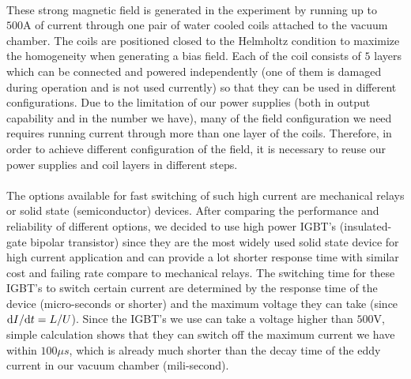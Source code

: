 \\
These strong magnetic field is generated in the experiment by running up to $500\text{A}$ of current through one pair of water cooled coils attached to the vacuum chamber. The coils are positioned closed to the Helmholtz condition to maximize the homogeneity when generating a bias field. Each of the coil consists of $5$ layers which can be connected and powered independently (one of them is damaged during operation and is not used currently) so that they can be used in different configurations. Due to the limitation of our power supplies (both in output capability and in the number we have), many of the field configuration we need requires running current through more than one layer of the coils. Therefore, in order to achieve different configuration of the field, it is necessary to reuse our power supplies and coil layers in different steps.\\
\\
The options available for fast switching of such high current are mechanical relays or solid state (semiconductor) devices. After comparing the performance and reliability of different options, we decided to use high power IGBT's (insulated-gate bipolar transistor) since they are the most widely used solid state device for high current application and can provide a lot shorter response time with similar cost and failing rate compare to mechanical relays. The switching time for these IGBT's to switch certain current are determined by the response time of the device (micro-seconds or shorter) and the maximum voltage they can take (since $\mathrm{d} I/\mathrm{d} t=L/U$). Since the IGBT's we use can take a voltage higher than $500\text{V}$, simple calculation shows that they can switch off the maximum current we have within $100\mu s$, which is already much shorter than the decay time of the eddy current in our vacuum chamber (mili-second).\\
\\
